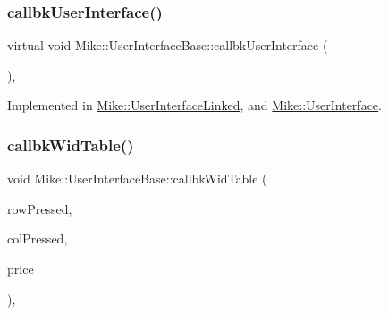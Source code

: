 \subsubsection{\texorpdfstring{callbk\+User\+Interface()}{callbkUserInterface()}}
{\footnotesize\ttfamily virtual void Mike\+::\+User\+Interface\+Base\+::callbk\+User\+Interface (\begin{DoxyParamCaption}\item[{\hyperlink{namespace_mike_a9dd611fa3c671b02e477e6b21465cc66}{Btn\+Pressed}}]{ }\end{DoxyParamCaption})\hspace{0.3cm}{\ttfamily [protected]}, {}}



Implemented in \hyperlink{class_mike_1_1_user_interface_linked_a3ad33941e45f2f171cb4db443cb46841}{Mike\+::\+User\+Interface\+Linked}, and \hyperlink{class_mike_1_1_user_interface_a9421dadab2852eb9110e25e2dff1d849}{Mike\+::\+User\+Interface}.

\mbox{\label{class_mike_1_1_user_interface_base_a56229f8ce8bb05e4b9908fcfc7222412}} 
\subsubsection{\texorpdfstring{callbk\+Wid\+Table()}{callbkWidTable()}}
{\footnotesize\ttfamily void Mike\+::\+User\+Interface\+Base\+::callbk\+Wid\+Table (\begin{DoxyParamCaption}\item[{int}]{row\+Pressed,  }\item[{int}]{col\+Pressed,  }\item[{long}]{price }\end{DoxyParamCaption})\hspace{0.3cm}{\ttfamily [protected]}, {\ttfamily [virtual]}}

\mbox{\label{class_mike_1_1_user_interface_base_a8db9431a5f9fc2683908c5d4cf086623}} 
